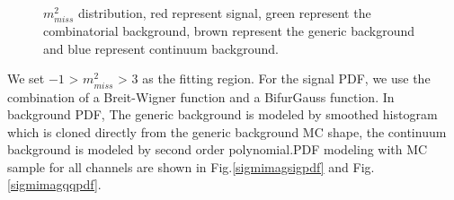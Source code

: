 \begin{figure}[h]
{	}
	\caption{$m^2_{miss}$ distribution, red represent signal, green represent the combinatorial background,  brown represent the generic background and blue represent continuum background.}
    	\label{sigmimagcon}	
\end{figure}
We set $-1$ > $m^2_{miss}$ > $3$ as the fitting region. For the signal PDF, we use the combination of a Breit-Wigner function and a BifurGauss function. In background PDF, The generic background is modeled by smoothed histogram which is cloned directly from the generic background MC shape, the continuum background is modeled by second order polynomial.PDF modeling with MC sample for all channels are shown in Fig.\ref{sigmimagsigpdf} and Fig. \ref{sigmimagqqpdf}.
